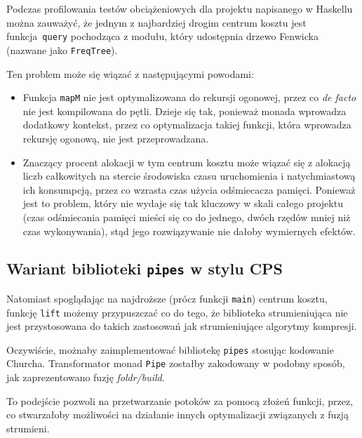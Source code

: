\documentclass[../../praca.tex]{subfiles}
\begin{document}
Podczas profilowania testów obciążeniowych dla projektu napisanego w Haskellu
można zauważyć, że jednym z najbardziej drogim centrum kosztu jest
funkcja~\texttt{query} pochodząca z modułu, który udostępnia
drzewo Fenwicka (nazwane jako \texttt{FreqTree}). 

Ten problem może się wiązać z następującymi powodami:
\begin{itemize}
  \item Funkcja \texttt{mapM} nie jest optymalizowana do rekursji ogonowej,
    przez co \emph{de facto} nie jest kompilowana do pętli. Dzieje się tak,
    ponieważ monada wprowadza dodatkowy kontekst, przez co optymalizacja
    takiej funkcji, która wprowadza rekursję ogonową, nie jest przeprowadzana.
  \item Znaczący procent alokacji w tym centrum kosztu może wiązać się z
    alokacją liczb całkowitych na stercie środowiska czasu uruchomienia
    i natychmiastową ich konsumpcją, przez co wzrasta czas użycia odśmiecacza
    pamięci. Ponieważ jest to problem, który nie wydaje się tak kluczowy
    w skali całego projektu (czas odśmiecania pamięci mieści się co do
    jednego, dwóch rzędów mniej niż czas wykonywania), stąd jego rozwiązywanie
    nie dałoby wymiernych efektów.
\end{itemize}

\subsection{Wariant biblioteki \texttt{pipes} w stylu CPS}

Natomiast spoglądając na najdroższe (prócz funkcji \texttt{main}) centrum kosztu,
funkcję \texttt{lift} możemy przypuszczać co do tego, że biblioteka strumieniująca
nie jest przystosowana do takich zastosowań jak strumieniujące algorytmy
kompresji.

Oczywiście, możnaby zaimplementować bibliotekę \texttt{pipes}
stosując kodowanie Churcha. Transformator monad \texttt{Pipe} 
zostałby zakodowany w podobny sposób, jak zaprezentowano
fuzję \emph{foldr/build}. 

To podejście pozwoli na przetwarzanie potoków za pomocą złożeń funkcji,
przez, co stwarzałoby możliwości na działanie innych optymalizacji związanych
z fuzją strumieni.
\end{document}

